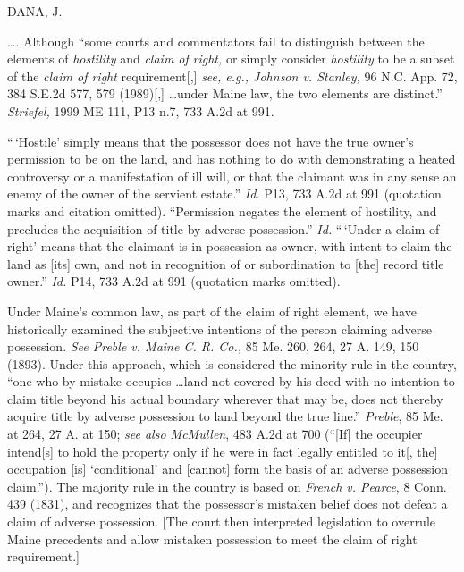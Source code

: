 
DANA, J.

\ldots. Although ``some courts and commentators fail to distinguish between the
elements of \textit{hostility} and \textit{claim of} \textit{right,} or simply
consider \textit{hostility} to be a subset of the \textit{claim of right}
requirement[,] \textit{see, e.g., Johnson v. Stanley,} 96 N.C. App. 72, 384
S.E.2d 577, 579 (1989)[,]  \ldots under Maine law, the two elements are
distinct.'' \textit{Striefel,} 1999 ME 111, P13 n.7, 733 A.2d at 991.

``\,`Hostile' simply means that the possessor does not have the true owner's
permission to be on the land, and has nothing to do with demonstrating a heated
controversy or a manifestation of ill will, or that the claimant was in any
sense an enemy of the owner of the servient estate.'' \textit{Id.} P13, 733
A.2d at 991 (quotation marks and citation omitted). ``Permission negates the
element of hostility, and precludes the acquisition of title by adverse
possession.'' \textit{Id.} ``\,`Under a claim of right' means that the claimant
is in possession as owner, with intent to claim the land as [its] own, and not
in recognition of or subordination to [the] record title owner.'' \textit{Id.}
P14, 733 A.2d at 991 (quotation marks omitted).

Under Maine's common law, as part of the claim of right element, we have
historically examined the subjective intentions of the person claiming
adverse possession. \textit{See Preble v. Maine C. R. Co.,} 85 Me. 260, 264, 27
A. 149, 150 (1893). Under this approach, which is considered the minority rule
in the country, ``one who by mistake occupies \ldots land not covered by his
deed with no intention to claim title beyond his actual boundary wherever that
may be, does not thereby acquire title by adverse possession to land beyond the
true line.'' \textit{Preble}, 85 Me. at 264, 27 A. at 150; \textit{see also
McMullen}, 483 A.2d at 700 (``[If] the occupier intend[s] to hold the property
only if he were in fact legally entitled to it[, the] occupation [is]
`conditional' and [cannot] form the basis of an adverse possession claim.'').
The majority rule in the country is based on \textit{French v. Pearce}, 8 Conn.
439 (1831), and recognizes that the possessor's mistaken belief does not defeat
a claim of adverse possession. [The court then interpreted legislation to
overrule Maine precedents and allow mistaken possession to meet the claim of
right requirement.]

